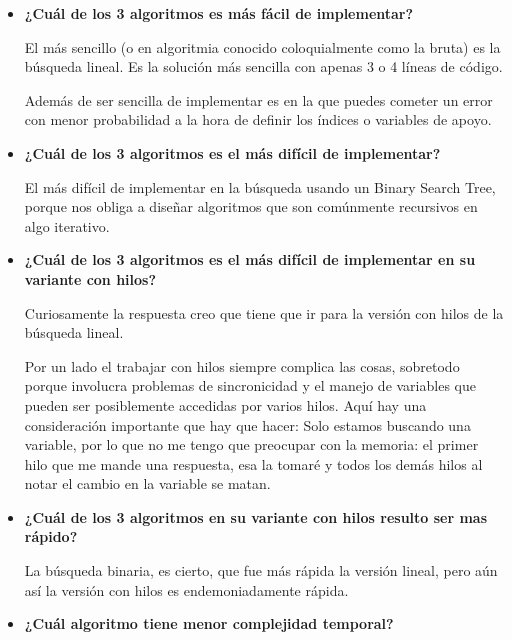 \documentclass[12pt, fleqn]{article}                             %
\theoremstyle{break}                                            %
\begin{document}
        \begin{itemize}
            \item 
                \textbf{¿Cuál de los 3 algoritmos es más fácil de implementar?}

                El más sencillo (o en algoritmia conocido coloquialmente como la bruta)
                es la búsqueda lineal. Es la solución más sencilla con apenas 3 o 4 líneas de código.

                Además de ser sencilla de implementar es en la que puedes cometer un error con menor
                probabilidad a la hora de definir los índices o variables de apoyo.

            \item 
                \textbf{¿Cuál de los 3 algoritmos es el más difícil de implementar?}

                El más difícil de implementar en la búsqueda usando un Binary Search Tree, porque
                nos obliga a diseñar algoritmos que son comúnmente recursivos en algo
                iterativo.

            \item
                \textbf{¿Cuál de los 3 algoritmos es el más difícil de implementar en su variante
                con hilos?}

                Curiosamente la respuesta creo que tiene que ir para la versión con hilos de la búsqueda
                lineal.

                Por un lado el trabajar con hilos siempre complica las cosas, sobretodo porque involucra
                problemas de sincronicidad y el manejo de variables que pueden ser posiblemente accedidas
                por varios hilos. Aquí hay una consideración importante que hay que hacer:
                Solo estamos buscando una variable, por lo que no me tengo que preocupar con la memoria: 
                el primer hilo que me mande una respuesta, esa la tomaré y todos los demás hilos al notar
                el cambio en la variable se matan.

            \item
                \textbf{¿Cuál de los 3 algoritmos en su variante con hilos resulto ser mas rápido?}

                La búsqueda binaria, es cierto, que fue más rápida la versión lineal, pero aún así
                la versión con hilos es endemoniadamente rápida.

            \item
                \textbf{¿Cuál algoritmo tiene menor complejidad temporal?}


\end{itemize}
\end{document}

